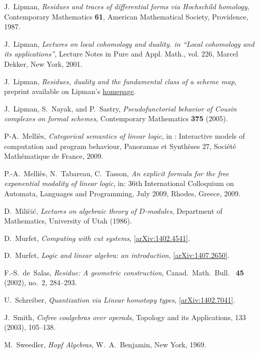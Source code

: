 \documentclass[english,letter paper,12pt,reqno]{article}
\theoremstyle{example}
\numberwithin{equation}{section}
\begin{document}
\begin{thebibliography}{BHLS03}
J.~Lipman, \textsl{Residues and traces of differential forms via {H}ochschild
  homology}, Contemporary Mathematics \textbf{61}, American Mathematical Society,
  Providence, 1987.

J.~Lipman, \emph{Lectures on local cohomology and duality. in ``{L}ocal cohomology
  and its applications''}, Lecture Notes in Pure and Appl. Math., vol. 226,
  Marcel Dekker, New York, 2001.

J.~Lipman, \textsl{Residues, duality and the fundamental class of a scheme map}, preprint available on Lipman's \href{http://www.math.purdue.edu/~Lipman/papers/Algecom.pdf}{homepage}.

J.~Lipman, S.~Nayak, and P.~Sastry, \emph{Pseudofunctorial behavior of {C}ousin
  complexes on formal schemes}, Contemporary Mathematics \textbf{375} (2005).

P-A.~Melli\`{e}s, \textsl{Categorical semantics of linear logic}, in : Interactive models of computation and program behaviour, Panoramas et Synth\`{e}ses $27$, Soci\'{e}t\'{e} Math\'{e}matique de France, $2009$.

P.-A.~Melli\`{e}s, N.~Tabareau, C.~Tasson, \textsl{An explicit formula for the free exponential modality of linear logic}, in: 36th International Colloquium on Automata, Languages and Programming, July 2009, Rhodes, Greece, 2009.

D.~Mili\u{c}i\'{c}, \textsl{Lectures on algebraic theory of $D$-modules}, Department of Mathematics, University of Utah (1986).

D.~Murfet, \textsl{Computing with cut systems}, \href{http://arxiv.org/abs/1402.4541}{[arXiv:1402.4541]}.

D.~Murfet, \textsl{Logic and linear algebra: an introduction}, \href{http://arxiv.org/abs/1407.2650}{[arXiv:1407.2650]}.

F.-S.~de~Salas, \textsl{Residue: A geometric construction}, Canad.~Math.~Bull.~
  \textbf{45} (2002), no.~2, 284--293.

U.~Schreiber, \textsl{Quantization via {L}inear homotopy types}, \href{http://arxiv.org/abs/1402.7041}{[arXiv:1402.7041]}.
  
J.~Smith, \textsl{Cofree coalgebras over operads}, Topology and its Applications, 133 (2003), 105--138.

M.~Sweedler, \textsl{Hopf Algebras}, W.~A.~Benjamin, New York, 1969.

\end{thebibliography}
\end{document}
